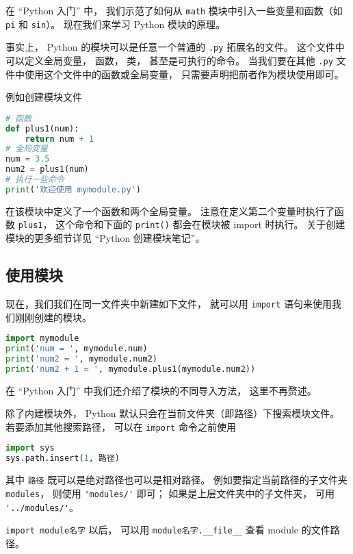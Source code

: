 

在 “Python 入门” 中， 我们示范了如何从 \verb|math| 模块中引入一些变量和函数（如 \verb|pi| 和 \verb|sin|）。 现在我们来学习 Python 模块的原理。

事实上， Python 的模块可以是任意一个普通的 \verb|.py| 拓展名的文件。 这个文件中可以定义全局变量， 函数， 类， 甚至是可执行的命令。 当我们要在其他 \verb|.py| 文件中使用这个文件中的函数或全局变量， 只需要声明把前者作为模块使用即可。

例如创建模块文件
\begin{lstlisting}[language=python,caption=mymodule.py]
# 函数
def plus1(num):
    return num + 1
# 全局变量
num = 3.5
num2 = plus1(num)
# 执行一些命令
print('欢迎使用 mymodule.py')
\end{lstlisting}
在该模块中定义了一个函数和两个全局变量。 注意在定义第二个变量时执行了函数 \verb|plus1|， 这个命令和下面的 \verb|print()| 都会在模块被 import 时执行。 关于创建模块的更多细节详见 “Python 创建模块笔记”。

\subsection{使用模块}
现在，我们我们在同一文件夹中新建如下文件， 就可以用 \verb|import| 语句来使用我们刚刚创建的模块。
\begin{lstlisting}[language=python,caption=test.py]
import mymodule
print('num = ', mymodule.num)
print('num2 = ', mymodule.num2)
print('num2 + 1 = ', mymodule.plus1(mymodule.num2))
\end{lstlisting}
在 “Python 入门” 中我们还介绍了模块的不同导入方法， 这里不再赘述。

除了内建模块外， Python 默认只会在当前文件夹（即路径）下搜索模块文件。 若要添加其他搜索路径， 可以在 \verb|import| 命令之前使用
\begin{lstlisting}[language=python]
import sys
sys.path.insert(1, 路径)
\end{lstlisting}
其中 \verb|路径| 既可以是绝对路径也可以是相对路径。 %
例如要指定当前路径的子文件夹 \verb|modules|， 则使用 \verb|'modules/'| 即可； 如果是上层文件夹中的子文件夹， 可用 \verb|'../modules/'|。

\verb|import module名字| 以后， 可以用 \verb|module名字.__file__| 查看 module 的文件路径。

